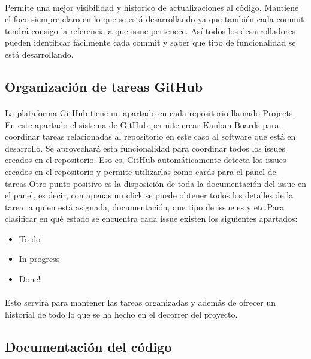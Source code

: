 \paragraph{}
Permite una mejor visibilidad y historico de actualizaciones al código. Mantiene el foco siempre claro en lo que se está desarrollando ya que también cada commit tendrá consigo la referencia a que issue pertenece. Así todos los desarrolladores pueden identificar fácilmente cada commit y saber que tipo de funcionalidad se está desarrollando. 

\subsection{Organización de tareas GitHub}
\paragraph{}
La plataforma GitHub tiene un apartado en cada repositorio llamado Projects. En este apartado el sistema de GitHub permite crear Kanban Boards para coordinar tareas relacionadas al repositorio en este caso al software que está en desarrollo. Se aprovechará esta funcionalidad para coordinar todos los issues creados en el repositorio. Eso es, GitHub automáticamente detecta los issues creados en el repositorio y permite utilizarlas como cards para el panel de tareas.Otro punto positivo es la disposición de toda la documentación del issue en el panel, es decir, con apenas un click se puede obtener todos los detalles de la tarea: a quien está asignada, documentación, que tipo de issue es y etc.Para clasificar en qué estado se encuentra cada issue existen los siguientes apartados:

\begin{itemize}
\item
  To do
\item
  In progress
\item
  Done!
\end{itemize}
\paragraph{}
Esto servirá para mantener las tareas organizadas y además de ofrecer un historial de todo lo que se ha hecho en el decorrer del proyecto.

\subsection{Documentación del código}
